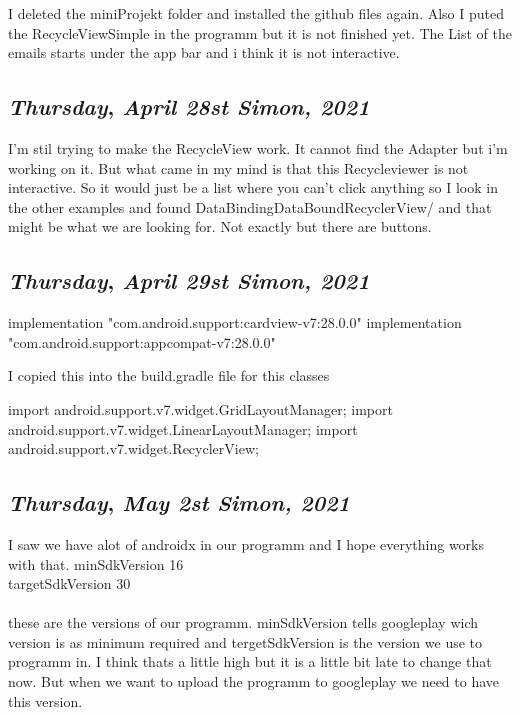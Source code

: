 I deleted the miniProjekt folder and installed the github files again.
Also I puted the RecycleViewSimple in the programm but it is not finished yet. 
The List of the emails starts under the app bar and i think it is not interactive. 


\def\day{\textit{April 28st Simon, 2021}}
\def\weekday{\textit{Thursday}}
\subsection*{\weekday, \day}


I'm stil trying to make the RecycleView work. It cannot find the Adapter but i'm working on it. But what came in my mind is that 
this Recycleviewer is not interactive. So it would just be a list where you can't click anything so I look in the other examples and found
DataBindingDataBoundRecyclerView/ and that might be what we are looking for. Not exactly but there are buttons. 


\def\day{\textit{April 29st Simon, 2021}}
\def\weekday{\textit{Thursday}}
\subsection*{\weekday, \day}

implementation "com.android.support:cardview-v7:28.0.0"
implementation "com.android.support:appcompat-v7:28.0.0"

I copied this into the build.gradle file for this classes

import android.support.v7.widget.GridLayoutManager;
import android.support.v7.widget.LinearLayoutManager;
import android.support.v7.widget.RecyclerView;

\def\day{\textit{May 2st Simon, 2021}}
\def\weekday{\textit{Thursday}}
\subsection*{\weekday, \day}

I saw we have alot of androidx in our programm and I hope everything works with that. 
minSdkVersion 16 \\
targetSdkVersion 30 \\ 
\\
these are the versions of our programm. minSdkVersion tells googleplay wich version is as minimum required and tergetSdkVersion is the version we use to programm in. I think thats a little high
but it is a little bit late to change that now. But when we want to upload the programm to googleplay we need to have this version. \\

